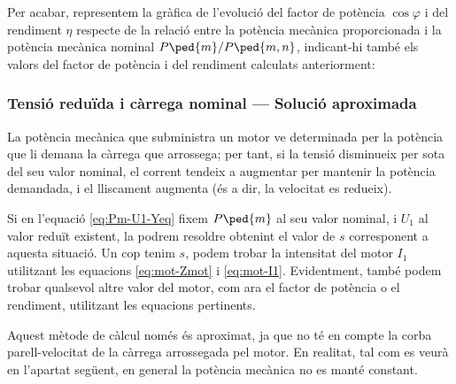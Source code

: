 \begin{exemple}
	Per acabar, representem  la gràfica de l'evolució del factor de potència $\cos\varphi$ i del rendiment $\eta$  respecte de la relació entre la potència mecànica proporcionada i la potència mecànica nominal $P\ped{m}/P\ped{m,n}$, indicant-hi també els valors del factor de potència i del rendiment calculats anteriorment:
	\begin{center}
		
	\end{center}

\end{exemple}
	
\subsubsection{Tensió reduïda i càrrega nominal --- Solució aproximada}

La potència mecànica que subministra un motor ve determinada per la potència que li demana la càrrega que arrossega; per tant, si la tensió disminueix per sota del seu valor nominal, el corrent tendeix a augmentar per  mantenir la potència demandada, i el lliscament augmenta (és a dir, la velocitat es redueix).

Si en l'equació \eqref{eq:Pm-U1-Yeq} fixem $P\ped{m}$ al seu valor nominal, i $U_1$ al valor reduït existent, la podrem resoldre obtenint el valor de $s$ corresponent  a aquesta situació. Un cop tenim $s$, podem trobar la intensitat del motor $I_1$ utilitzant les equacions \eqref{eq:mot-Zmot} i \eqref{eq:mot-I1}. Evidentment, també podem trobar qualsevol altre valor del motor, com  ara el factor de potència o el rendiment, utilitzant les equacions pertinents.

Aquest mètode de càlcul només és aproximat, ja que no té en compte la corba parell-velocitat de la càrrega arrossegada pel motor. En realitat, tal com es veurà en l'apartat següent, en general la potència mecànica no es manté constant.

